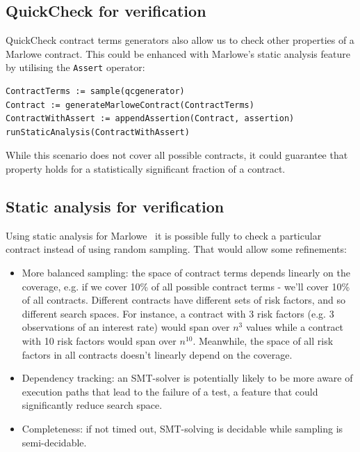 \documentclass[runningheads]{llncs}
\begin{document}
\subsection{QuickCheck for verification}

QuickCheck contract terms generators also allow us to check
other properties of a Marlowe contract. This could be enhanced
with Marlowe's static analysis feature by utilising the \texttt{Assert} operator:

\begin{verbatim}
ContractTerms := sample(qcgenerator) 
Contract := generateMarloweContract(ContractTerms) 
ContractWithAssert := appendAssertion(Contract, assertion) 
runStaticAnalysis(ContractWithAssert)
\end{verbatim}

While this scenario does not cover all possible contracts, it could guarantee that
property holds for a statistically significant fraction of a contract.

\subsection{Static analysis for verification}

Using static analysis for Marlowe~\cite{} it is possible fully to check a particular contract instead of using random
sampling. That would allow some refinements: 
\begin{itemize}
\item More balanced sampling: the space of contract terms depends linearly on
the coverage, e.g. if we cover 10\% of all possible contract terms
- we'll cover 10\% of all contracts. Different contracts have different
sets of risk factors, and so different search spaces. For instance, a
contract with 3 risk factors (e.g. 3 observations of an interest rate)
would span over $n^3$ values while a contract with 10 risk
factors would span over $n^{10}$. Meanwhile, the space of
all risk factors in all contracts doesn't linearly depend on the coverage.
\item Dependency tracking: an SMT-solver is potentially likely to be more aware of execution
paths that lead to the failure of a test, a feature that could significantly reduce
search space. 
\item Completeness: if not timed out, SMT-solving is decidable while sampling
is semi-decidable. 
\end{itemize}
\end{document}
